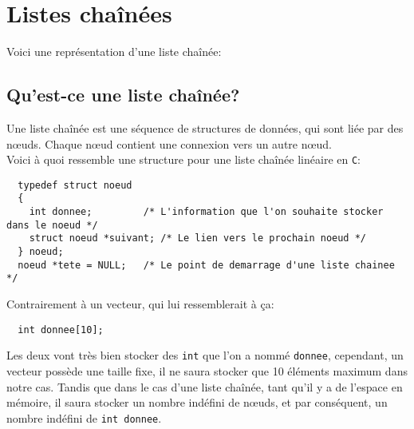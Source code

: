 \documentclass[11pt]{article}
\begin{document}
\newpage
\section{Listes chaînées}
Voici une représentation d'une liste chaînée: 

\subsection{Qu'est-ce une liste chaînée?}
Une liste chaînée est une séquence de structures de données, qui sont liée par des n\oe{}uds.
Chaque n\oe{}ud contient une connexion vers un autre n\oe{}ud.\\
Voici à quoi ressemble une structure pour une liste chaînée linéaire en \texttt{C}:
\begin{lstlisting}
  typedef struct noeud
  {
    int donnee;         /* L'information que l'on souhaite stocker dans le noeud */
    struct noeud *suivant; /* Le lien vers le prochain noeud */
  } noeud;
  noeud *tete = NULL;   /* Le point de demarrage d'une liste chainee */
\end{lstlisting}

Contrairement à un vecteur, qui lui ressemblerait à ça:
\begin{lstlisting}
  int donnee[10];
\end{lstlisting}

Les deux vont très bien stocker des \texttt{int} que l'on a nommé \texttt{donnee}, cependant, un vecteur possède une taille fixe, il ne saura stocker que 10 éléments maximum dans notre cas. Tandis que dans le cas d'une liste chaînée, tant qu'il y a de l'espace en mémoire, il saura stocker un nombre indéfini de n\oe{}uds, et par conséquent, un nombre indéfini de \texttt{int donnee}.
\end{document}
